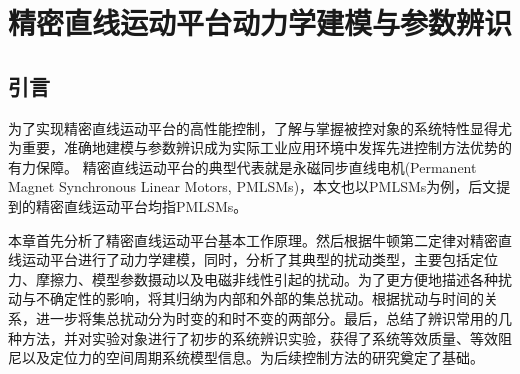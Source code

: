 \chapter{精密直线运动平台动力学建模与参数辨识}
\section{引言}
为了实现精密直线运动平台的高性能控制，了解与掌握被控对象的系统特性显得尤为重要，准确地建模与参数辨识成为实际工业应用环境中发挥先进控制方法优势的有力保障。
精密直线运动平台的典型代表就是永磁同步直线电机(Permanent Magnet Synchronous Linear Motors, PMLSMs)，本文也以PMLSMs为例，后文提到的精密直线运动平台均指PMLSMs。

本章首先分析了精密直线运动平台基本工作原理。然后根据牛顿第二定律对精密直线运动平台进行了动力学建模，同时，分析了其典型的扰动类型，主要包括定位力\cite{zhao2005adaptive,chen2009modeling,bascetta2009force,hu2009coordinated,yao2011adaptive}、摩擦力\cite{de1995new}、模型参数摄动以及电磁非线性引起的扰动\cite{kano2005simple}。为了更方便地描述各种扰动与不确定性的影响，将其归纳为内部和外部的集总扰动。根据扰动与时间的关系，进一步将集总扰动分为时变的和时不变的两部分。最后，总结了辨识常用的几种方法，并对实验对象进行了初步的系统辨识实验，获得了系统等效质量、等效阻尼以及定位力的空间周期系统模型信息。为后续控制方法的研究奠定了基础。
